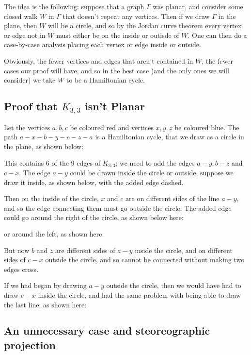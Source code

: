 \documentclass[]{article}
\begin{document}
The idea is the following: suppose that a graph \(\Gamma\) was planar,
and consider some closed walk \(W\) in \(\Gamma\) that doesn't repeat
any vertices. Then if we draw \(\Gamma\) in the plane, then \(W\) will
be a circle, and so by the Jordan curve theorem every vertex or edge not
in \(W\) must either be on the inside or outisde of \(W\). One can then
do a case-by-case analysis placing each vertex or edge inside or
outside.

Obviously, the fewer vertices and edges that aren't contained in \(W\),
the fewer cases our proof will have, and so in the best case )and the
only ones we will consider) we take \(W\) to be a Hamiltonian cycle.

\subsection{\texorpdfstring{Proof that \(K_{3,3}\) isn't
Planar}{Proof that K\_\{3,3\} isn't Planar}}\label{proof-that-kux5f33-isnt-planar}

Let the vertices \(a,b,c\) be coloured red and vertices \(x,y,z\) be
coloured blue. The path \(a-x-b-y-c-z-a\) is a Hamiltonian cycle, that
we draw as a circle in the plane, as shown below:

This contains 6 of the 9 edges of \(K_{3,3}\); we need to add the edges
\(a-y, b-z\) and \(c-x\). The edge \(a-y\) could be drawn inside the
circle or outside, suppose we draw it inside, as shown below, with the
added edge dashed.

Then on the inside of the circle, \(x\) and \(c\) are on different sides
of the line \(a-y\), and so the edge connecting them must go outside the
circle. The added edge could go around the right of the circle, as shown
below here:

or around the left, as shown here:

But now \(b\) and \(z\) are different sides of \(a-y\) inside the
circle, and on different sides of \(c-x\) outside the circle, and so
cannot be connected without making two edges cross.

If we had began by drawing \(a-y\) outside the circle, then we would
have had to draw \(c-x\) inside the circle, and had the same problem
with being able to draw the last line; as shown here:

\subsection{An unnecessary case and steoreographic
projection}\label{an-unnecessary-case-and-steoreographic-projection}
\end{document}
